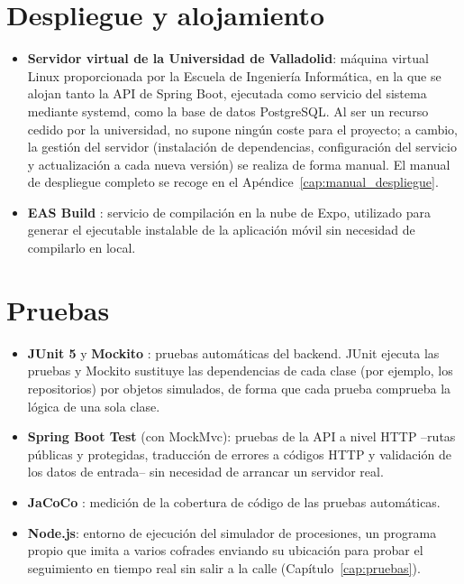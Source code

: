 \section{Despliegue y alojamiento}

\begin{itemize}
    \item \textbf{Servidor virtual de la Universidad de Valladolid}: máquina virtual Linux proporcionada por la Escuela de Ingeniería Informática, en la que se alojan tanto la API de Spring Boot, ejecutada como servicio del sistema mediante systemd, como la base de datos PostgreSQL. Al ser un recurso cedido por la universidad, no supone ningún coste para el proyecto; a cambio, la gestión del servidor (instalación de dependencias, configuración del servicio y actualización a cada nueva versión) se realiza de forma manual. El manual de despliegue completo se recoge en el Apéndice~\ref{cap:manual_despliegue}.
    \item \textbf{EAS Build} \cite{expo}: servicio de compilación en la nube de Expo, utilizado para generar el ejecutable instalable de la aplicación móvil sin necesidad de compilarlo en local.
\end{itemize}

\section{Pruebas}

\begin{itemize}
    \item \textbf{JUnit 5} \cite{junit} y \textbf{Mockito} \cite{mockito}: pruebas automáticas del backend. JUnit ejecuta las pruebas y Mockito sustituye las dependencias de cada clase (por ejemplo, los repositorios) por objetos simulados, de forma que cada prueba comprueba la lógica de una sola clase.
    \item \textbf{Spring Boot Test} (con MockMvc): pruebas de la API a nivel HTTP --rutas públicas y protegidas, traducción de errores a códigos HTTP y validación de los datos de entrada-- sin necesidad de arrancar un servidor real.
    \item \textbf{JaCoCo} \cite{jacoco}: medición de la cobertura de código de las pruebas automáticas.
    \item \textbf{Node.js}: entorno de ejecución del simulador de procesiones, un programa propio que imita a varios cofrades enviando su ubicación para probar el seguimiento en tiempo real sin salir a la calle (Capítulo~\ref{cap:pruebas}).
\end{itemize}

